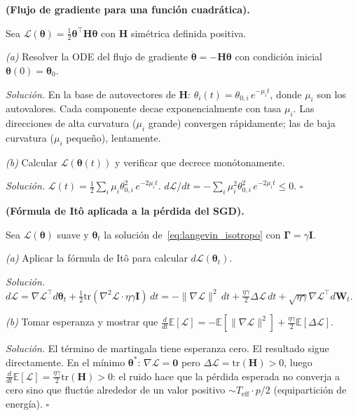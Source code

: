 \begin{ejercicio}
\label{ej:flujo_grad_cuad}
\textbf{(Flujo de gradiente para una función cuadrática).}

Sea $\mathcal{L}(\bm{\theta}) = \frac{1}{2}\bm{\theta}^\top\bm{H}
\bm{\theta}$ con $\bm{H}$ simétrica definida positiva.

\medskip\noindent\textit{(a)} Resolver la ODE del flujo de gradiente
$\dot{\bm{\theta}} = -\bm{H}\bm{\theta}$ con condición inicial
$\bm{\theta}(0) = \bm{\theta}_0$.

\medskip\noindent\textit{Solución.}
En la base de autovectores de $\bm{H}$: $\theta_i(t) =
\theta_{0,i}\,e^{-\mu_i t}$, donde $\mu_i$ son los autovalores.
Cada componente decae exponencialmente con tasa $\mu_i$. Las
direcciones de alta curvatura ($\mu_i$ grande) convergen rápidamente;
las de baja curvatura ($\mu_i$ pequeño), lentamente.

\medskip\noindent\textit{(b)} Calcular $\mathcal{L}(\bm{\theta}(t))$
y verificar que decrece monótonamente.

\medskip\noindent\textit{Solución.}
$\mathcal{L}(t) = \frac{1}{2}\sum_i \mu_i\theta_{0,i}^2\,e^{-2\mu_i t}$.
$d\mathcal{L}/dt = -\sum_i \mu_i^2\theta_{0,i}^2\,e^{-2\mu_i t} \leq 0$.
$\square$
\end{ejercicio}

\begin{ejercicio}
\label{ej:ito_loss}
\textbf{(Fórmula de Itô aplicada a la pérdida del SGD).}

Sea $\mathcal{L}(\bm{\theta})$ suave y $\bm{\theta}_t$ la solución
de~\eqref{eq:langevin_isotropo} con $\bm{\Gamma} = \gamma\bm{I}$.

\medskip\noindent\textit{(a)} Aplicar la fórmula de Itô para calcular
$d\mathcal{L}(\bm{\theta}_t)$.

\medskip\noindent\textit{Solución.}
$d\mathcal{L} = \nabla\mathcal{L}^\top d\bm{\theta}_t +
\frac{1}{2}\text{tr}(\nabla^2\mathcal{L}\cdot
\eta\gamma\bm{I})\,dt
= -\|\nabla\mathcal{L}\|^2\,dt +
\frac{\eta\gamma}{2}\Delta\mathcal{L}\,dt
+ \sqrt{\eta\gamma}\nabla\mathcal{L}^\top d\bm{W}_t$.

\medskip\noindent\textit{(b)} Tomar esperanza y mostrar que
$\frac{d}{dt}\mathbb{E}[\mathcal{L}] =
-\mathbb{E}[\|\nabla\mathcal{L}\|^2] +
\frac{\eta\gamma}{2}\mathbb{E}[\Delta\mathcal{L}]$.

\medskip\noindent\textit{Solución.}
El término de martingala tiene esperanza cero. El resultado sigue
directamente. En el mínimo $\bm{\theta}^*$:
$\nabla\mathcal{L} = \bm{0}$ pero
$\Delta\mathcal{L} = \text{tr}(\bm{H}) > 0$, luego
$\frac{d}{dt}\mathbb{E}[\mathcal{L}] = \frac{\eta\gamma}{2}
\text{tr}(\bm{H}) > 0$: el ruido hace que la pérdida esperada no
converja a cero sino que fluctúe alrededor de un valor positivo
$\sim T_{\text{eff}}\cdot p/2$ (equipartición de energía).
$\square$
\end{ejercicio}

